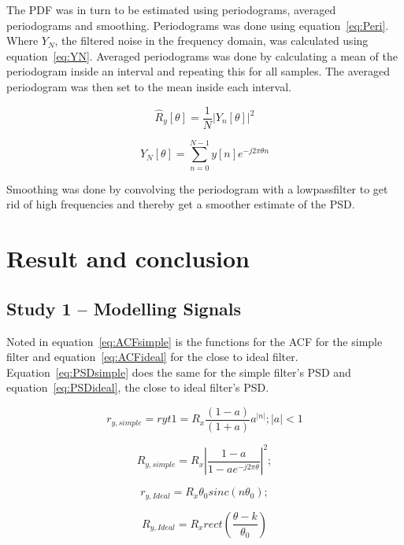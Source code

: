 \documentclass[10pt]{article}
\begin{document}
The PDF was in turn to be estimated using periodograms, averaged periodograms and smoothing. Periodograms was done using equation~\ref{eq:Peri}. Where $Y_N$, the filtered noise in the frequency domain, was calculated using equation~\ref{eq:YN}. Averaged periodograms was done by calculating a mean of the periodogram inside an interval and repeating this for all samples. The averaged periodogram was then set to the mean inside each  interval.

\begin{equation}
\label{eq:Peri}
\hat{R}_y[\theta] = \frac{1}{N}|Y_n[\theta]|^2
\end{equation}

\begin{equation}
\label{eq:YN}
Y_N[\theta] = \sum_{n=0}^{N-1}y[n]e^{-j2\pi\theta n}
\end{equation}

Smoothing was done by convolving the periodogram with a lowpassfilter to get rid of high frequencies and thereby get a smoother estimate of the PSD.

\section{Result and conclusion}
\subsection{Study 1 – Modelling Signals}

Noted in equation~\ref{eq:ACFsimple} is the functions for the ACF
for the simple filter and equation~\ref{eq:ACFideal} for the close to ideal filter.
Equation~\ref{eq:PSDsimple} does the same for the simple filter's PSD
and equation~\ref{eq:PSDideal}, the close to ideal filter's PSD.

\begin{equation}
  \label{eq:ACFsimple}
  r_{y,simple} = ryt1 = R_x\frac{(1-a)}{(1+a)}a^{|n|};  |a| < 1
\end{equation}

\begin{equation}
  \label{eq:PSDsimple}
  R_{y,simple} =  R_x|\frac{1-a}{1-ae^{-j2\pi\theta}}|^2;
\end{equation}

\begin{equation}
  \label{eq:ACFideal}
  r_{y,Ideal} = R_x\theta_{0}sinc(n\theta_0);
\end{equation}

\begin{equation}
  \label{eq:PSDideal}
  R_{y,Ideal} = R_xrect(\frac{\theta - k}{\theta_0})
\end{equation}
\clearpage
\end{document}
